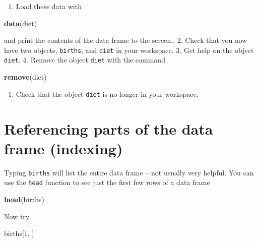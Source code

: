 \documentclass[
]{book}
\newenvironment{Shaded}{\begin{snugshade}}{\end{snugshade}}
\newcommand{\DecValTok}[1]{\textcolor[rgb]{0.00,0.00,0.81}{#1}}
\newcommand{\FunctionTok}[1]{\textcolor[rgb]{0.13,0.29,0.53}{\textbf{#1}}}
\newcommand{\NormalTok}[1]{#1}
\providecommand{\tightlist}{%
  \setlength{\itemsep}{0pt}\setlength{\parskip}{0pt}}
\begin{document}
\begin{enumerate}
\def\labelenumi{\arabic{enumi}.}
\tightlist
\item
  Load these data with
\end{enumerate}

\begin{Shaded}
\begin{Highlighting}[]
\FunctionTok{data}\NormalTok{(diet)}
\end{Highlighting}
\end{Shaded}

and print the contents of the data frame to the screen..
2. Check that you now have two objects, \texttt{births}, and \texttt{diet} in your workspace.
3. Get help on the object \texttt{diet}.
4. Remove the object \texttt{diet} with the command

\begin{Shaded}
\begin{Highlighting}[]
\FunctionTok{remove}\NormalTok{(diet)}
\end{Highlighting}
\end{Shaded}

\begin{enumerate}
\def\labelenumi{\arabic{enumi}.}
\setcounter{enumi}{4}
\tightlist
\item
  Check that the object \texttt{diet} is no longer in your workspace.
\end{enumerate}

\section{Referencing parts of the data frame (indexing)}\label{referencing-parts-of-the-data-frame-indexing}

Typing \texttt{births} will list the entire data frame -- not usually
very helpful. You can use the \texttt{head} function to see just the
first few rows of a data frame

\begin{Shaded}
\begin{Highlighting}[]
\FunctionTok{head}\NormalTok{(births)}
\end{Highlighting}
\end{Shaded}

Now try

\begin{Shaded}
\begin{Highlighting}[]
\NormalTok{births[}\DecValTok{1}\NormalTok{, ]}
\end{Highlighting}
\end{Shaded}
\end{document}
